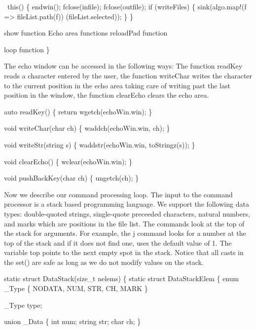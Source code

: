   ~this() \{
    endwin();
    fclose(infile);
    fclose(outfile);
    if (writeFiles) \{
        sink(algo.map!(f => fileList.path(f))
                      (fileList.selected));
    \}
  \}
  
  \LA{}show function\RA{}
  \LA{}Echo area functions\RA{}
  \LA{}reloadPad function\RA{}

  \LA{}loop function\RA{}
\}

\nwendcode{}The echo window can be accessed in the following ways: The function
{\Tt{}readKey\nwendquote} reads a character entered by the user, the function
{\Tt{}writeChar\nwendquote} writes the character to the current position in the echo
area taking care of writing past the last position in the window, the
function {\Tt{}clearEcho\nwendquote} clears the echo area.

\nwenddocs{}\endmoddef\nwstartdeflinemarkup\nwenddeflinemarkup
auto readKey()
\{
  return wgetch(echoWin.win);
\}

void writeChar(char ch)
\{
  waddch(echoWin.win, ch);
\}

void writeStr(string s)
\{
  waddstr(echoWin.win, toStringz(s));
\}

void clearEcho()
\{
  wclear(echoWin.win);
\}

void pushBackKey(char ch)
\{
  ungetch(ch);
\}

\nwendcode{}Now we describe our command processing loop. The input to the
command processor is a stack based programming language. We support
the following data types: double-quoted strings, single-quote
preceeded characters, natural numbers, and marks which are positions
in the file list. The commands look at the top of the stack for
arguments. For example, the {\Tt{}j\nwendquote} command looks for a number at the
top of the stack and if it does not find one, uses the default value
of 1. The variable {\Tt{}top\nwendquote} points to the next empty spot in the
stack. Notice that all casts in the {\Tt{}set()\nwendquote} are safe as long as we
do not modify values on the stack.

\nwenddocs{}\endmoddef\nwstartdeflinemarkup\nwenddeflinemarkup
static struct DataStack(size_t nelems) \{
  static struct DataStackElem \{
    enum _Type \{ NODATA, NUM, STR, CH, MARK \}

    _Type type;
  
    union _Data \{
      int num;
      string str;
      char ch;
    \}

